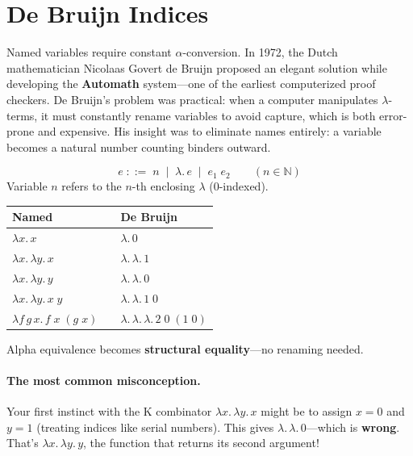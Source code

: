 \documentclass[11pt,a4paper]{article}
\theoremstyle{definition}
\newcommand{\lam}{\lambda}
\newcommand{\Nat}{\mathbb{N}}
\begin{document}
\section{De Bruijn Indices}\label{sec:debruijn}

Named variables require constant $\alpha$-conversion. In 1972, the Dutch
mathematician Nicolaas Govert de Bruijn proposed an elegant solution while
developing the \textbf{Automath} system---one of the earliest computerized
proof checkers. De Bruijn's problem was practical: when a computer manipulates
$\lam$-terms, it must constantly rename variables to avoid capture, which is
both error-prone and expensive. His insight was to eliminate names entirely: a
variable becomes a natural number counting binders outward.

\begin{defnbox}
\[
  e \;::=\; n \;\mid\; \lam.\, e \;\mid\; e_1\; e_2
  \qquad (n \in \Nat)
\]
Variable $n$ refers to the $n$-th enclosing $\lam$ (0-indexed).
\end{defnbox}

\begin{center}
\renewcommand{\arraystretch}{1.5}
\begin{tabular}{lcl}
\textbf{Named} & & \textbf{De Bruijn} \\
\hline
$\lam x.\, x$                            && $\lam.\, 0$ \\
$\lam x.\, \lam y.\, x$                  && $\lam.\, \lam.\, 1$ \\
$\lam x.\, \lam y.\, y$                  && $\lam.\, \lam.\, 0$ \\
$\lam x.\, \lam y.\, x\; y$              && $\lam.\, \lam.\, 1\; 0$ \\
$\lam f\, g\, x.\, f\;x\;(g\;x)$        && $\lam.\, \lam.\, \lam.\, 2\;0\;(1\;0)$ \\
\end{tabular}
\end{center}

Alpha equivalence becomes \textbf{structural equality}---no renaming needed.

\paragraph{The most common misconception.}
Your first instinct with the K combinator $\lam x.\, \lam y.\, x$ might be to
assign $x = 0$ and $y = 1$ (treating indices like serial numbers). This gives
$\lam.\, \lam.\, 0$---which is \textbf{wrong}. That's
$\lam x.\, \lam y.\, y$, the function that returns its second argument!
\end{document}
